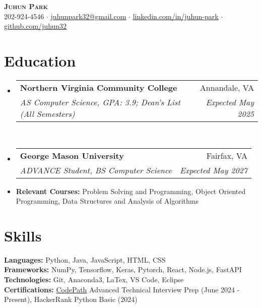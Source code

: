 \documentclass[letterpaper,11pt]{article}
\makeatletter
\newcommand{\resumeItem}[1]{
  \item\small{
    {#1 \vspace{-2pt}}
  }
}
\newcommand{\resumeSubheading}[4]{
  \vspace{-2pt}\item
    \begin{tabular*}{0.97\textwidth}[t]{l@{\extracolsep{\fill}}r@{\hspace{-0.2in}}}
        \textbf{#1} & #2 \\
        \textit{\small#3} & \textit{\small #4} \\
    \end{tabular*}\vspace{-0pt}
}
\newcommand{\resumeSubHeadingListStart}{\begin{itemize}[leftmargin=0.00in, rightmargin=-0.2in, label={}]}
\newcommand{\resumeSubHeadingListEnd}{\end{itemize}}
\makeatother
\begin{document}
\begin{center}
    \textbf{\Huge \scshape {Juhun Park}} \\ \vspace{1pt}
    \small 202-924-4546 $\cdot$ 
    \href{mailto:riann3207@gmail.com}{\underline{juhunpark32@gmail.com}} $\cdot$
    \href{https://linkedin.com/in/juhun-park}{\underline{linkedin.com/in/juhun-park}} $\cdot$
    \href{https://github.com/juhun32}{\underline{github.com/juhun32}} \\
\end{center}


\section{Education}
    \resumeSubHeadingListStart
        \resumeSubheading
            {Northern Virginia Community College}{Annandale, VA}
            {AS Computer Science, GPA: 3.9; Dean's List (All Semesters)}{Expected May 2025} \\
        \resumeSubheading
            {George Mason University}{Fairfax, VA}
            {ADVANCE Student, BS Computer Science}{Expected May 2027}
        
        \resumeItem{\textbf{Relevant Courses: }{Problem Solving and Programming, Object Oriented Programming, Data Structures and Analysis of Algorithms}}
    \resumeSubHeadingListEnd

\section{Skills}
    \vspace*{3pt}
    \begin{itemize}[leftmargin=0in, label={}]
        \small{\item{
            \textbf{Languages: }{Python, Java, JavaScript, HTML, CSS} \\
            \textbf{Frameworks: }{NumPy, Tensorflow, Keras, Pytorch, React, Node.js, FastAPI} \\
            \textbf{Technologies: }{Git, Anaconda3, LaTex, VS Code, Eclipse} \\
            \textbf{Certifications: }{\href{https://www.codepath.org/}{\underline{CodePath}} Advanced Technical Interview Prep (June 2024 - Present), HackerRank Python Basic (2024)} \\
        }}
    \end{itemize}
\end{document}
